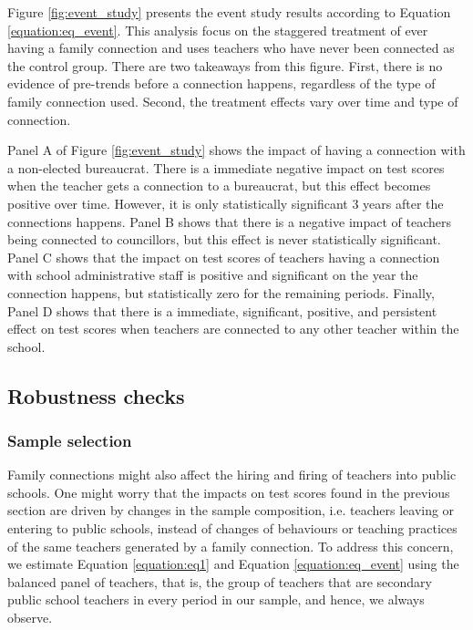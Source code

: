 \documentclass[12pt,runningheads]{article}
\begin{document}
Figure \ref{fig:event_study} presents the event study results according to Equation \ref{equation:eq_event}. This analysis focus on the staggered treatment of ever having a family connection and uses teachers who have never been connected as the control group. There are two takeaways from this figure. First, there is no evidence of pre-trends before a connection happens, regardless of the type of family connection used. Second, the treatment effects vary over time and type of connection. 

Panel A of Figure \ref{fig:event_study} shows the impact of having a connection with a non-elected bureaucrat. There is a immediate negative impact on test scores when the teacher gets a connection to a bureaucrat, but this effect becomes positive over time. However, it is only statistically significant 3 years after the connections happens. Panel B shows that there is a negative impact of teachers being connected to councillors, but this effect is never statistically significant. Panel C shows that the impact on test scores of teachers having a connection with school administrative staff is positive and significant on the year the connection happens, but statistically zero for the remaining periods. Finally, Panel D shows that there is a immediate, significant, positive, and persistent effect on test scores when teachers are connected to any other teacher within the school.

\subsection{Robustness checks}

\subsubsection{Sample selection}

Family connections might also affect the hiring and firing of teachers into public schools. One might worry that the impacts on test scores found in the previous section are driven by changes in the sample composition, i.e. teachers leaving or entering to public schools, instead of changes of behaviours or teaching practices of the same teachers generated by a family connection. To address this concern, we estimate Equation \ref{equation:eq1} and Equation  \ref{equation:eq_event} using the balanced panel of teachers, that is, the group of teachers that are secondary public school teachers in every period in our sample, and hence, we always observe. 
\end{document}
